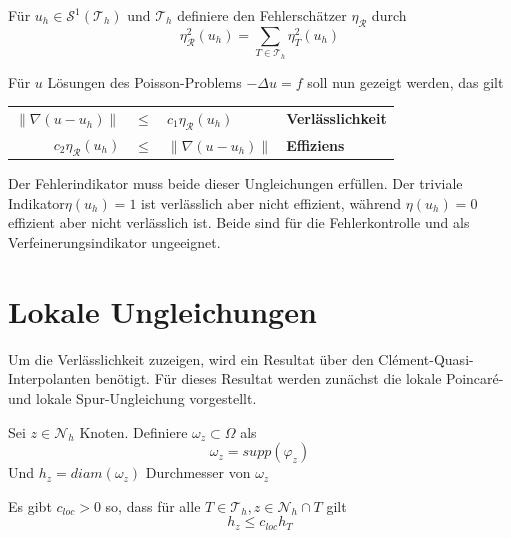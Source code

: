 \begin{definition}[Fehlerschätzer]
	Für $u_h \in \mathscr{S}^1(\mathscr{T}_h) \text{ und } \mathscr{T}_h$ definiere den Fehlerschätzer $\eta_\mathscr{R}$ durch
	\[
	\eta_\mathscr{R}^2(u_h)=\sum_{T\in\mathscr{T}_h} \eta^2_T(u_h)
	\]
\end{definition}
Für $u$ Lösungen des Poisson-Problems $-\Delta u = f$ soll nun gezeigt werden, das gilt \\
\begin{center}
	\begin{tabular}{r c l l}
		$\|\nabla(u-u_h)\|$ & $\leq$ & $c_1 \eta_\mathscr{R}(u_h)$ &\textbf{Verlässlichkeit} \\
		$c_2 \eta_\mathscr{R}(u_h)$ &$\leq$& $\|\nabla(u-u_h)\|$ &\textbf{Effiziens} \\
	\end{tabular}
\end{center}
Der Fehlerindikator muss beide dieser Ungleichungen erfüllen. Der triviale Indikator$\eta(u_h)=1$ ist verlässlich aber nicht effizient, während $\eta(u_h)=0$ effizient aber nicht verlässlich ist. Beide sind für die Fehlerkontrolle und als Verfeinerungsindikator ungeeignet.
\section{Lokale Ungleichungen}
Um die Verlässlichkeit zuzeigen, wird ein Resultat über den Clément-Quasi-Interpolanten benötigt. Für dieses Resultat werden zunächst die lokale Poincaré- und lokale Spur-Ungleichung vorgestellt.
\begin{definition}
	Sei $z \in \mathscr{N}_h$ Knoten. Definiere $\omega_z \subset \Omega$ als
	\[
	\omega_z = supp(\varphi_z)
	\]
	Und $h_z = diam(\omega_z)$ Durchmesser von $\omega_z$
\end{definition}
\begin{bemerkung}
	Es gibt $c_{loc} > 0$ so, dass für alle $T \in\mathscr{T}_h, z\in\mathscr{N}_h\cap T$ gilt
	\[
	h_z\leq c_{loc}h_T
	\]
\end{bemerkung}

